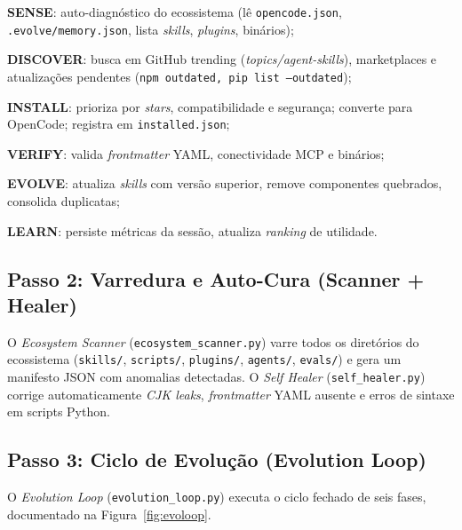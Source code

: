 \documentclass[
  article,
  12pt,
  oneside,
  a4paper,
  brazil,
  sumario=tradicional
]{abntex2}
\begin{document}
\begin{alineas}
\item \textbf{SENSE}: auto-diagnóstico do ecossistema (lê \texttt{opencode.json}, \texttt{.evolve/\allowbreak memory.json}, lista \emph{skills}, \emph{plugins}, binários);
\item \textbf{DISCOVER}: busca em GitHub trending (\emph{topics/agent-skills}), marketplaces e atualizações pendentes (\texttt{npm outdated, pip list --outdated});
\item \textbf{INSTALL}: prioriza por \emph{stars}, compatibilidade e segurança; converte para OpenCode; registra em \texttt{installed.json};
\item \textbf{VERIFY}: valida \emph{frontmatter} YAML, conectividade MCP e binários;
\item \textbf{EVOLVE}: atualiza \emph{skills} com versão superior, remove componentes quebrados, consolida duplicatas;
\item \textbf{LEARN}: persiste métricas da sessão, atualiza \emph{ranking} de utilidade.
\end{alineas}

\subsection{Passo 2: Varredura e Auto-Cura (Scanner + Healer)}

O \emph{Ecosystem Scanner} (\texttt{ecosystem\_scanner.py}) varre todos os diretórios do ecossistema (\texttt{skills/}, \texttt{scripts/}, \texttt{plugins/}, \texttt{agents/}, \texttt{evals/}) e gera um manifesto JSON com anomalias detectadas. O \emph{Self Healer} (\texttt{self\_healer.py}) corrige automaticamente \emph{CJK leaks}, \emph{frontmatter} YAML ausente e erros de sintaxe em scripts Python.

\subsection{Passo 3: Ciclo de Evolução (Evolution Loop)}

O \emph{Evolution Loop} (\texttt{evolution\_loop.py}) executa o ciclo fechado de seis fases, documentado na Figura~\ref{fig:evoloop}.
\end{document}
